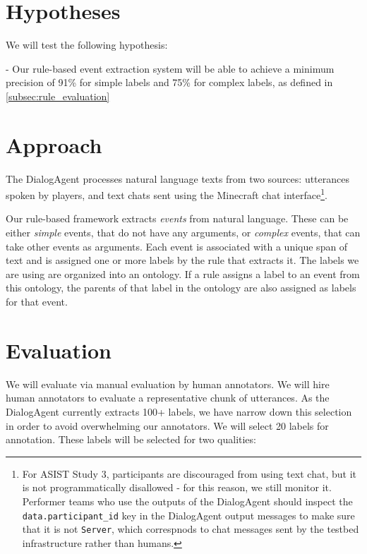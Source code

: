 \section{Hypotheses}

We will test the following hypothesis: 

- Our rule-based event extraction system will be able to achieve a minimum
precision of 91\% for simple labels and 75\% for complex labels, as defined in
\autoref{subsec:rule_evaluation}

\section{Approach}

The DialogAgent processes natural language texts from two sources: utterances
spoken by players, and text chats sent using the Minecraft chat
interface\footnote{For ASIST Study 3, participants are discouraged from using
    text chat, but it is not programmatically disallowed - for this reason, we
    still monitor it. Performer teams who use the outputs of the DialogAgent
    should inspect the \texttt{data.participant\_id} key in the DialogAgent
    output messages to make sure that it is not \texttt{Server}, which
correspnods to chat messages sent by the testbed infrastructure rather than
humans.}.

Our rule-based framework extracts \emph{events} from natural language. These
can be either \emph{simple} events, that do not have any arguments, or
\emph{complex} events, that can take other events as arguments. Each event is
associated with a unique span of text and is assigned one or more labels by the
rule that extracts it. The labels we are using are organized into an ontology.
If a rule assigns a label to an event from this ontology, the parents of that
label in the ontology are also assigned as labels for that event.

\section{Evaluation}

We will evaluate via manual evaluation by human annotators. We will hire human
annotators to evaluate a representative chunk of utterances. As the DialogAgent
currently extracts 100+ labels, we have narrow down this selection in order to
avoid overwhelming our annotators.  We will select 20 labels for annotation.
These labels will be selected for two qualities:

